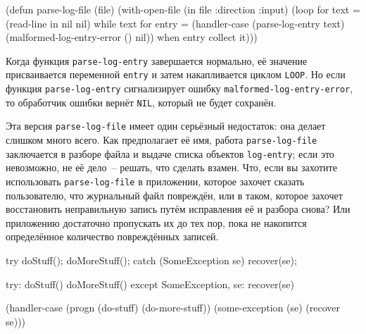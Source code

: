 \begin{myverb}
(defun parse-log-file (file)
  (with-open-file (in file :direction :input)
    (loop for text = (read-line in nil nil) while text
       for entry = (handler-case (parse-log-entry text)
                     (malformed-log-entry-error () nil))
       when entry collect it)))
\end{myverb}

Когда функция \lstinline{parse-log-entry} завершается нормально, её значение присваивается
переменной \lstinline{entry} и затем накапливается циклом \lstinline{LOOP}. Но если функция
\lstinline{parse-log-entry} сигнализирует ошибку \lstinline{malformed-log-entry-error}, то
обработчик ошибки вернёт \lstinline{NIL}, который не будет сохранён.

Эта версия \lstinline{parse-log-file} имеет один серьёзный недостаток: она делает слишком много
всего. Как предполагает её имя, работа \lstinline{parse-log-file} заключается в разборе файла и
выдаче списка объектов \lstinline{log-entry}; если это невозможно, не её дело~-- решать, что
сделать взамен. Что, если вы захотите использовать \lstinline{parse-log-file} в приложении,
которое захочет сказать пользователю, что журнальный файл повреждён, или в таком, которое
захочет восстановить неправильную запись путём исправления её и разбора снова? Или
приложению достаточно пропускать их до тех пор, пока не накопится определённое количество
повреждённых записей.

\vspace{1.8cm}

\begin{lrbox}{\chonenineone}
  \begin{minipage}{\linewidth}
\begin{myverb}
try {
  doStuff();
  doMoreStuff();
} catch (SomeException se) {
  recover(se);
}
\end{myverb} 
  \end{minipage}
\end{lrbox}

\begin{lrbox}{\choneninetwo}
  \begin{minipage}{\linewidth}
\begin{myverb}
try:
  doStuff()
  doMoreStuff()
except SomeException, se:
  recover(se)
\end{myverb} 
  \end{minipage}
\end{lrbox}

\begin{lrbox}{\choneninethree}
  \begin{minipage}{\linewidth}
\begin{myverb}
(handler-case
    (progn
      (do-stuff)
      (do-more-stuff))
  (some-exception (se) (recover se)))
\end{myverb} 
  \end{minipage}
\end{lrbox}


